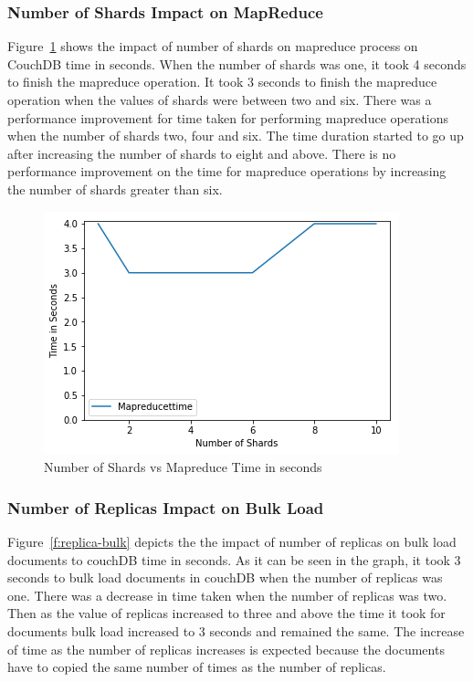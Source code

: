 \subsubsection{Number of Shards Impact on MapReduce}


Figure~\ref{f:shard-mapreduce} shows the impact of number of shards on
mapreduce process on CouchDB time in seconds. When the number of shards was one, it took 4 seconds to finish
the mapreduce operation. It took 3 seconds to finish
the mapreduce operation when the values of shards were between two and
six. There was a performance
improvement for time taken for performing mapreduce operations when
the number of shards two, four and six.  The time duration started to
go up after increasing the number of shards to eight and above. There
is no performance improvement on the time for mapreduce operations by
increasing the number of shards greater than six.

\begin{figure}[!ht]
  \centering\includegraphics[width=\columnwidth]{../images/ShardsMapReduce.png}
  \caption{Number of Shards vs Mapreduce Time in seconds }\label{f:shard-mapreduce}
\end{figure}

\subsubsection{Number of Replicas Impact on Bulk Load}


Figure~\ref{f:replica-bulk} depicts the the impact of number of replicas
on bulk load documents to couchDB time in seconds. As it can be seen
in the graph, it took 3 seconds to bulk load documents in couchDB when
the number of replicas was one. There was a decrease in time
taken when the number of replicas was two. Then as the value of
replicas increased to three and above the time it took for documents
bulk load increased to 3 seconds and remained the same. The increase
of time as the number of replicas increases is expected because the
documents have to copied the same number of times as the number of
replicas. 


